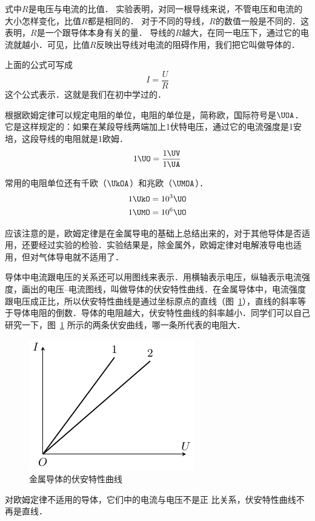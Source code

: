 式中$R$是电压与电流的比值．
实验表明，对同一根导线来说，不管电压和电流的大小怎样变化，比值$R$都是相同的．
对于不同的导线，$R$的数值一般是不同的．这表明，$R$是一个跟导体本身有关的量．
导线的$R$越大，在同一电压下，通过它的电流就越小．可见，比值$R$反映出导线对电流的阻碍作用，我们把它叫做导体的．

上面的公式可写成
\[I=\frac{U}{R}\]
这个公式表示．这就是我们在初中学过的．

根据欧姆定律可以规定电阻的单位，电阻的单位是，简称欧，国际符号是$\UOA$． 它是这样规定的：如果在某段导线两端加上1伏特电压，通过它的电流强度是1安培，这段导线的电阻就是1欧姆．
\[1 \UO =\frac{1 \UV }{1 \UA} \]

常用的电阻单位还有千欧（$\UkOA$）和兆欧（$\UMOA$）．
\[\begin{split}
    1 \UkO &= 10^{3}\UO\\
    1\UMO &=10^{6}\UO
\end{split}\]

应该注意的是，欧姆定律是在金属导电的基础上总结出来的，对于其他导体是否适用，还要经过实验的检验．实验结果是，除金属外，欧姆定律对电解液导电也适用，但对气体导电就不适用了．

导体中电流跟电压的关系还可以用图线来表示．用横轴表示电压，纵轴表示电流强度，画出的电压--电流图线，叫做导体的伏安特性曲线．在金属导体中，电流强度跟电压成正比，所以伏安特性曲线是通过坐标原点的直线（图~\ref{fig_B_7-3}），直线的斜率等于导体电阻的倒数．导体的电阻越大，伏安特性曲线的斜率越小．同学们可以自己研究一下，图~\ref{fig_B_7-3} 所示的两条伏安曲线，哪一条所代表的电阻大．
\begin{figure}[htbp]
    \centering
    \includegraphics{fig/B/7-3.pdf}
    \caption{金属导体的伏安特性曲线}\label{fig_B_7-3}
\end{figure}


对欧姆定律不适用的导体，它们中的电流与电压不是正
比关系，伏安特性曲线不再是直线．


